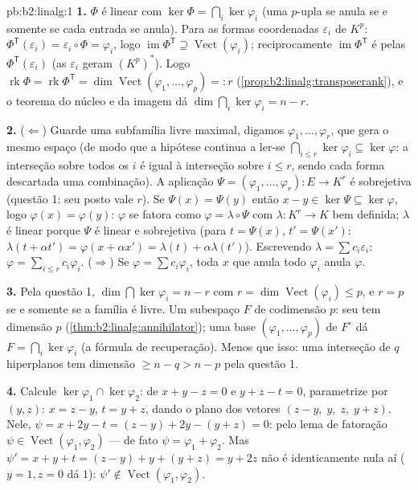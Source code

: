 \begin{solution}{pb:b2:linalg:1}
\textbf{1.} $\Phi$ é linear com $\ker\Phi = \bigcap_i
\ker\varphi_i$ (uma $p$-upla se anula se e somente se cada entrada se anula). Para
as formas coordenadas $\varepsilon_i$ de $K^p$: $\Phi^{\mathsf
T}(\varepsilon_i) = \varepsilon_i \circ \Phi = \varphi_i$, logo
$\operatorname{im}\Phi^{\mathsf T} \supseteq
\operatorname{Vect}(\varphi_i)$; reciprocamente
$\operatorname{im}\Phi^{\mathsf T}$ é  pelas
$\Phi^{\mathsf T}(\varepsilon_i)$ (as $\varepsilon_i$ geram
$(K^p)^*$). Logo $\operatorname{rk}\Phi = \operatorname{rk}
\Phi^{\mathsf T} = \dim\operatorname{Vect}(\varphi_1, \dots,
\varphi_p) =: r$ (\cref{prop:b2:linalg:transposerank}), e o
teorema do núcleo e da imagem dá $\dim\bigcap_i\ker\varphi_i = n - r$.

\textbf{2.} ($\Leftarrow$) Guarde uma subfamília livre maximal, digamos
$\varphi_1, \dots, \varphi_r$, que gera o mesmo espaço (de modo que a
hipótese continua a ler-se $\bigcap_{i \leq r}\ker\varphi_i \subseteq
\ker\varphi$: a interseção sobre todos os $i$ é igual à interseção sobre
$i \leq r$, sendo cada forma descartada uma combinação). A aplicação
$\Psi = (\varphi_1, \dots, \varphi_r) \colon E \to K^r$ é
sobrejetiva (questão 1: seu posto vale $r$). Se $\Psi(x) = \Psi(y)$
então $x - y \in \ker\Psi \subseteq \ker\varphi$, logo $\varphi(x) =
\varphi(y)$: $\varphi$ se fatora como $\varphi = \lambda \circ \Psi$
com $\lambda \colon K^r \to K$ bem definida; $\lambda$ é linear
porque $\Psi$ é linear e sobrejetiva (para $t = \Psi(x)$, $t' =
\Psi(x')$: $\lambda(t + \alpha t') = \varphi(x + \alpha x') =
\lambda(t) + \alpha\lambda(t')$). Escrevendo $\lambda = \sum c_i
\varepsilon_i$: $\varphi = \sum_{i \leq r} c_i\varphi_i$.
($\Rightarrow$) Se $\varphi = \sum c_i \varphi_i$, toda $x$
que anula todo $\varphi_i$ anula $\varphi$.

\textbf{3.} Pela questão 1, $\dim\bigcap\ker\varphi_i = n - r$
com $r = \dim\operatorname{Vect}(\varphi_i) \leq p$, e $r = p$
se e somente se a família é livre. Um subespaço $F$ de codimensão $p$: seu
 tem dimensão $p$
(\cref{thm:b2:linalg:annihilator}); uma base $(\varphi_1, \dots,
\varphi_p)$ de $F^\circ$ dá $F = \bigcap_i\ker\varphi_i$ (a
fórmula de recuperação). Menos que isso: uma interseção de $q$ hiperplanos tem
dimensão $\geq n - q > n - p$ pela questão 1.

\textbf{4.} Calcule $\ker\varphi_1 \cap \ker\varphi_2$: de $x
+ y - z = 0$ e $y + z - t = 0$, parametrize por $(y, z)$: $x = z
- y$, $t = y + z$, dando o plano dos vetores $(z - y,\; y,\;
z,\; y + z)$. Nele, $\psi = x + 2y - t = (z - y) + 2y - (y + z)
= 0$: pelo lema de fatoração $\psi \in
\operatorname{Vect}(\varphi_1, \varphi_2)$ --- de fato $\psi =
\varphi_1 + \varphi_2$. Mas $\psi' = x + y + t = (z - y) + y +
(y + z) = y + 2z$ não é identicamente nula aí ($y = 1, z = 0$
dá $1$): $\psi' \notin \operatorname{Vect}(\varphi_1,
\varphi_2)$.


\end{solution}

